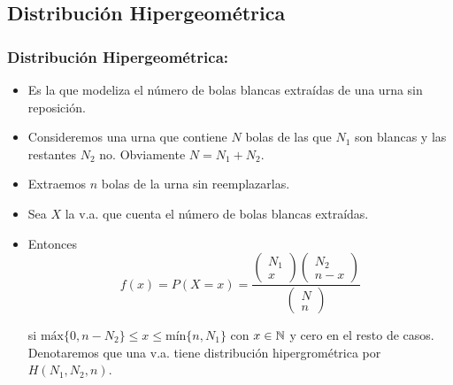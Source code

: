 \subsection{Distribución  Hipergeométrica}

\begin{frame}
\frametitle{Distribución Hipergeométrica: }
\begin{itemize}
\item Es la que modeliza el número de bolas blancas extraídas de una urna
     sin reposición. 
\item Consideremos una urna que contiene $N$ bolas de las que
     $N_{1}$ son blancas y las restantes $N_{2}$ no. Obviamente $N=N_{1}+N_{2}$.
\item Extraemos $n$ bolas de la urna sin reemplazarlas.
\item Sea $X$ la v.a. que cuenta el n\'umero de bolas blancas extraídas.
 \item     Entonces 
$$f(x)=P(X=x)=\frac{\left(\begin{array}{cc} N_{1}\\ x\end{array}\right)
     \left(\begin{array}{cc} N_{2}\\ n-x\end{array}\right)}{\left(\begin{array}{cc}
     N\\n\end{array}\right)}$$
     
si $\mbox{máx}\{0,n-N_{2}\}\leq x \leq \mbox{mín}\{n,N_{1}\}$ con $x\in \mathbb{N}$ y
     cero en el resto de casos.
Denotaremos que una v.a. tiene distribución hipergrométrica por $H(N_1,N_2,n)$.
\end{itemize}
\end{frame}

